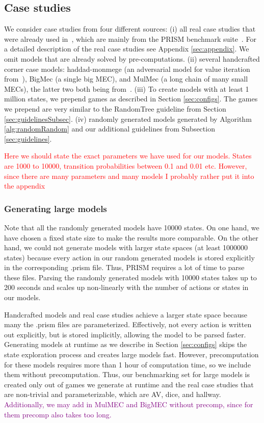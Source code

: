\subsection{Case studies}
We consider case studies from four different sources: 
(i) all real case studies that were already used in~\cite{gandalf}, which are mainly from the PRISM benchmark suite~\cite{PRISMben}.
For a detailed description of the real case studies see Appendix \ref{sec:appendix}.
We omit models that are already solved by pre-computations.
(ii) several handcrafted corner case models: haddad-monmege (an adversarial model for value iteration from~\cite{haddadmonmege}), BigMec (a single big MEC), and MulMec (a long chain of many small MECs), the latter two both being from~\cite{gandalf}.
(iii) To create models with at least 1 million states, we prepend games as described in Section \ref{sec:configs}.
The games we prepend are very similar to the RandomTree guideline from Section \ref{sec:guidelinesSubsec}.
(iv) randomly generated models generated by Algorithm \ref{alg:randomRandom} and our additional guidelines from Subsection \ref{sec:guidelines}.

\textcolor{red}{Here we should state the exact parameters we have used for our models. States are 1000 to 10000, transition probabilities between 0.1 and 0.01 etc.
However, since there are many parameters and many models I probably rather put it into the appendix}

\subsubsection*{Generating large models} \label{subsec:largeModels}
Note that all the randomly generated models have 10000 states. On one hand, we have chosen a fixed state size to make the results more comparable.
On the other hand, we could not generate models with larger state spaces (at least 1000000 states) because every action in our random generated models is stored explicitly
in the corresponding .prism file. Thus, PRISM requires a lot of time to parse these files. Parsing the randomly generated models with 10000 states takes
up to 200 seconds and scales up non-linearly with the number of actions or states in our models.

Handcrafted models and real case studies achieve a larger state space because many the .prism files are parameterized.
Effectively, not every action is written out explicitly, but is stored implicitly, allowing the model to be parsed faster.
Generating models at runtime as we describe in Section \ref{sec:configs} skips the state exploration process and 
creates large models fast. However, precomputation for these models requires more than 1 hour of computation time, so we include them without precomputation.
Thus, our benchmarking set for large models is created only out of games we generate at runtime and the real case studies that are non-trivial and parameterizable, 
which are AV, dice, and hallway. \textcolor{purple}{Additionally, we may add in MulMEC and BigMEC without precomp, since for them precomp also takes too long.}

